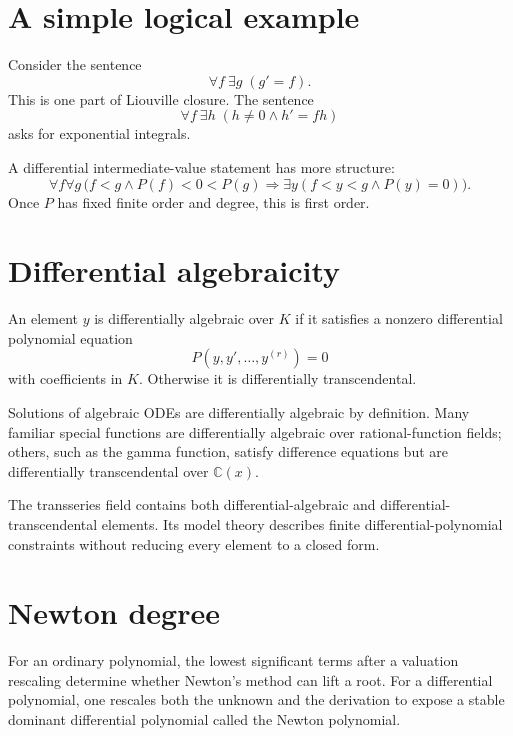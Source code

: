 \documentclass[11pt,openany]{book}
\theoremstyle{definition}
\theoremstyle{plain}
\theoremstyle{remark}
\newcommand{\C}{\mathbb{C}}
\begin{document}
\section{A simple logical example}

Consider the sentence
\begin{equation}\label{eq:logical-antiderivative}
 \forall f\ \exists g\;(g'=f).
\end{equation}
This is one part of Liouville closure. The sentence
\begin{equation}\label{eq:logical-exp-integral}
 \forall f\ \exists h\;(h\ne0\wedge h'=fh)
\end{equation}
asks for exponential integrals.

A differential intermediate-value statement has more structure:
\[
 \forall f\forall g\,
 \bigl(f<g\wedge P(f)<0<P(g)
 \Rightarrow\exists y(f<y<g\wedge P(y)=0)\bigr).
\]
Once $P$ has fixed finite order and degree, this is first order.

\section{Differential algebraicity}

An element $y$ is differentially algebraic over $K$ if it satisfies a nonzero differential polynomial equation
\begin{equation}\label{eq:differential-algebraic}
 P(y,y',\dots,y^{(r)})=0
\end{equation}
with coefficients in $K$. Otherwise it is differentially transcendental.

Solutions of algebraic ODEs are differentially algebraic by definition. Many familiar special functions are differentially algebraic over rational-function fields; others, such as the gamma function, satisfy difference equations but are differentially transcendental over $\C(x)$.

The transseries field contains both differential-algebraic and differential-transcendental elements. Its model theory describes finite differential-polynomial constraints without reducing every element to a closed form.

\section{Newton degree}

For an ordinary polynomial, the lowest significant terms after a valuation rescaling determine whether Newton's method can lift a root. For a differential polynomial, one rescales both the unknown and the derivation to expose a stable dominant differential polynomial called the Newton polynomial.
\end{document}
